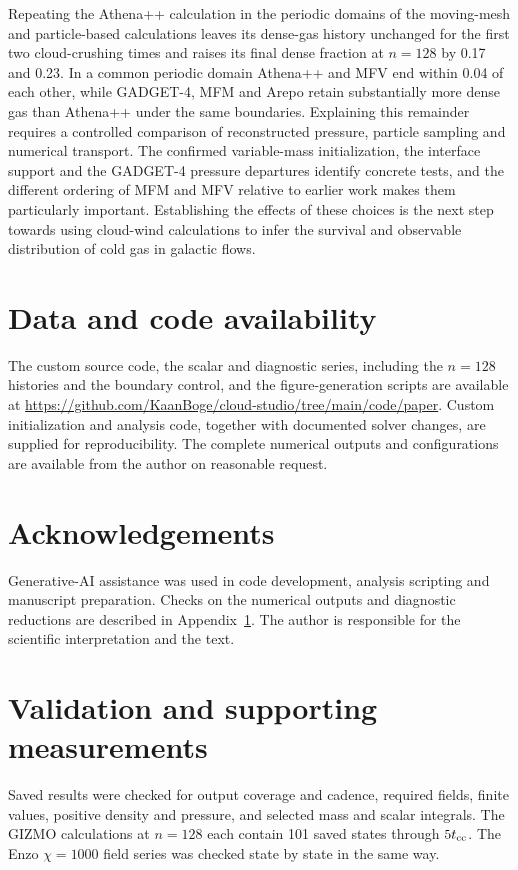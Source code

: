 \documentclass[twocolumn,apj,numberedappendix]{openjournal}
\begin{document}
Repeating the Athena++ calculation in the periodic domains of the moving-mesh and particle-based calculations leaves its dense-gas history unchanged for the first two cloud-crushing times and raises its final dense fraction at $n=128$ by 0.17 and 0.23. In a common periodic domain Athena++ and MFV end within 0.04 of each other, while GADGET-4, MFM and Arepo retain substantially more dense gas than Athena++ under the same boundaries. Explaining this remainder requires a controlled comparison of reconstructed pressure, particle sampling and numerical transport. The confirmed variable-mass initialization, the interface support and the GADGET-4 pressure departures identify concrete tests, and the different ordering of MFM and MFV relative to earlier work makes them particularly important. Establishing the effects of these choices is the next step towards using cloud-wind calculations to infer the survival and observable distribution of cold gas in galactic flows.

\section*{Data and code availability}
The custom source code, the scalar and diagnostic series, including the $n=128$ histories and the boundary control, and the figure-generation scripts are available at \url{https://github.com/KaanBoge/cloud-studio/tree/main/code/paper}. Custom initialization and analysis code, together with documented solver changes, are supplied for reproducibility. The complete numerical outputs and configurations are available from the author on reasonable request.

\section*{Acknowledgements}
Generative-AI assistance was used in code development, analysis scripting and manuscript preparation. Checks on the numerical outputs and diagnostic reductions are described in Appendix~\ref{app:validation}. The author is responsible for the scientific interpretation and the text.




\appendix
\section{Validation and supporting measurements}\label{app:validation}
Saved results were checked for output coverage and cadence, required fields, finite values, positive density and pressure, and selected mass and scalar integrals. The GIZMO calculations at $n=128$ each contain 101 saved states through $5t_{\rm cc}$. The Enzo $\chi=1000$ field series was checked state by state in the same way.
\end{document}
